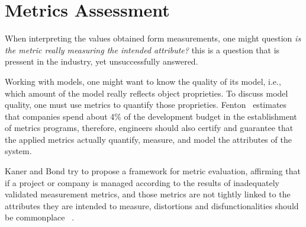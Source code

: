 \section{Metrics Assessment} \label{assess}
\begin{comment}
Effective management of any process requires quantification, measurement, and modeling.
Software metrics provide a quantitative basis for the development and validation of models of the software development process.
Metrics can be used to improve software productivity and quality\cite{g1:Millis:1998}.
\end{comment}



\par When interpreting the values obtained form measurements, one might question \emph{is the metric really measuring the intended attribute?} this is a question that is pressent in the industry, yet unsuccessfully answered. 

\par Working with models, one might want to know the quality of its model, i.e., which amount of the model really reflects object proprieties. To discuss model quality, one must use metrics to quantify those proprieties. Fenton~\cite{g1:Fenton:1999} estimates that companies spend about 4\% of the development budget in the establishment of metrics programs, therefore, engineers should also certify and guarantee that the applied metrics actually quantify, measure, and model the attributes of the system.

\par Kaner and Bond try to propose a framework for metric evaluation, affirming that if a project or company is managed according to the results of inadequately validated measurement metrics, and those metrics are not tightly linked to the attributes they are intended to measure, distortions and disfunctionalities should be commonplace ~\cite{g1:kaner:2004}.

\begin{comment}
	This has a likely consequence: if a project or company is managed according to the results of measurements, and those metrics are inadequately validated, insufficiently understood, and not tightly linked to the attributes they are intended to measure, measurement distortions and dysfunctional should be commonplace\cite{g1:kaner:2004}.
\end{comment}

